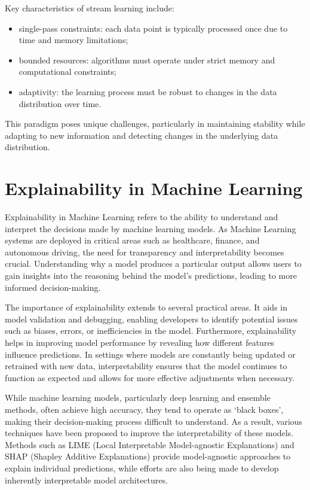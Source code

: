 Key characteristics of stream learning include:
\begin{itemize}
    \item single-pass constraints: each data point is typically processed once due to
          time and memory limitations;
    \item bounded resources: algorithms must operate under strict memory and
          computational constraints;
    \item adaptivity: the learning process must be robust to changes in the data
          distribution over time.
\end{itemize}

This paradigm poses unique challenges, particularly in maintaining stability
while adapting to new information and detecting changes in the underlying data
distribution.

\section{Explainability in Machine Learning}\label{sec:explainability}
Explainability in Machine Learning refers to the ability to understand and interpret 
the decisions made by machine learning models. As Machine Learning systems are deployed 
in critical areas such as healthcare, finance, and autonomous driving, the need for 
transparency and interpretability becomes crucial. Understanding why a model produces 
a particular output allows users to gain insights into the reasoning behind the model's 
predictions, leading to more informed decision-making.

The importance of explainability extends to several practical areas. It aids in
model validation and debugging, enabling developers to identify potential
issues such as biases, errors, or inefficiencies in the model. Furthermore,
explainability helps in improving model performance by revealing how different
features influence predictions. In settings where models are constantly being
updated or retrained with new data, interpretability ensures that the model
continues to function as expected and allows for more effective adjustments
when necessary.

While machine learning models, particularly deep learning and ensemble methods,
often achieve high accuracy, they tend to operate as `black boxes', making
their decision-making process difficult to understand. As a result, various
techniques have been proposed to improve the interpretability of these models.
Methods such as LIME (Local Interpretable Model-agnostic Explanations) and SHAP
(Shapley Additive Explanations) provide model-agnostic approaches to explain
individual predictions, while efforts are also being made to develop inherently
interpretable model architectures.

